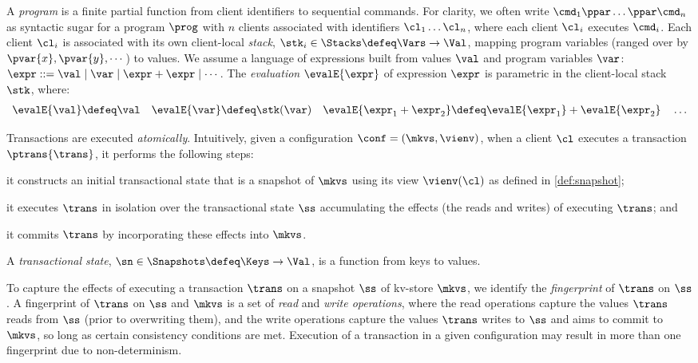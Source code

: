 A {\em program} is a finite partial function from client identifiers to sequential
commands.
For clarity, we often write \( \cmd_{1}\ppar \dots \ppar \cmd_{n}\) as syntactic sugar 
for a program \( \prog \) with $n$ clients associated with identifiers
$\cl_1 \dots \cl_n$, where each client $\cl_i$ executes
$\cmd_i$. 
Each client $\cl_i$ is associated with its own client-local  \emph{stack}, 
$\stk_i \in \Stacks \defeq \Vars \to \Val$,  mapping program variables
(ranged over by $\pvar{x}, \pvar{y}, \cdots$)
to values. 
We assume a language of expressions built from values \( \val \)
and program variables \( \var \):
$\expr ::= \val \mid \var \mid \expr + \expr \mid \cdots$.
The \emph{evaluation} $\evalE{\expr}$ of expression $\expr$ is parametric in
the client-local stack \( \stk \), where:%
%
{%
\begin{gather*}
\evalE{\val} \defeq
\val
\quad
\evalE{\var} \defeq
\stk(\var)
\quad
\evalE{\expr_{1} + \expr_{2}} \defeq
\evalE{\expr_{1}} + \evalE{\expr_{2}}
\quad
\dots
\end{gather*}%
}%

Transactions are executed \emph{atomically}. 
Intuitively, given a configuration $\conf = (\mkvs, \vienv)$, 
when a client $\cl$ executes a transaction $\ptrans{\trans}$, 
it performs the following steps: 
\begin{enumerate*}
	\item it constructs an initial transactional state that is a snapshot of $\mkvs$ using its view $\vienv(\cl)$ as defined in \cref{def:snapshot};  
	\item it executes $\trans$ in isolation over the transactional state $\ss$
        accumulating the effects (the reads and writes) of executing $\trans$; and
	\item it commits $\trans$ by incorporating these effects into $\mkvs$.
\end{enumerate*}

\begin{definition}
\label{def:heaps}
A \emph{transactional state}, \( \sn \in \Snapshots \defeq \Keys \to
\Val\),  is a function from keys to values.
\end{definition}


To capture the effects of executing a transaction $\trans$ on a snapshot $\ss$ of kv-store $\mkvs$, 
we identify the \emph{fingerprint} of $\trans$ on $\ss$.
A fingerprint of $\trans$ on $\ss$ and $\mkvs$
is a set of \emph{read} and \emph{write operations}, where
the read operations capture the values $\trans$ reads from $\ss$ (prior to overwriting them), and
the write operations capture the values $\trans$ writes to $\ss$ and aims to commit to $\mkvs$, so long as certain consistency conditions are met.  
Execution of a transaction in a given configuration may result in more than one fingerprint due to non-determinism. 


